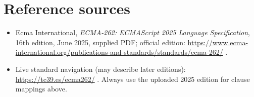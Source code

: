 \documentclass[11pt,letterpaper]{article}
\providecommand{\tightlist}{\setlength{\itemsep}{0pt}\setlength{\parskip}{0pt}}
\begin{document}
\section{Reference sources}\label{reference-sources}

\begin{itemize}
\tightlist
\item
  Ecma International, \emph{ECMA-262: ECMAScript 2025 Language Specification}, 16th edition, June 2025, supplied PDF; official edition: \url{https://www.ecma-international.org/publications-and-standards/standards/ecma-262/} .
\item
  Live standard navigation (may describe later editions): \url{https://tc39.es/ecma262/} . Always use the uploaded 2025 edition for clause mappings above.
\end{itemize}
\end{document}
